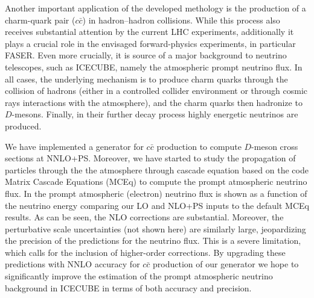\documentclass{FBR_Bericht_2025}
\begin{document}
\begin{refsection}
Another important application of the developed \minnlo{} methology is the production
of a charm-quark pair ($c\bar c$) 
in hadron--hadron collisions. While this process also receives
substantial attention by the current LHC experiments, additionally it plays a crucial role in 
the envisaged forward-physics experiments, in particular FASER. Even more crucially,
it is source of a major background to neutrino telescopes, such as ICECUBE, namely
the atmospheric prompt neutrino flux.
In all cases, the underlying mechanism is to produce charm quarks through the collision
of hadrons (either in a controlled collider environment or through cosmic rays interactions 
with the atmosphere), and the charm quarks then hadronize to $D$-mesons. Finally, in 
their further decay process highly energetic neutrinos are produced.

We have implemented a \minnlo{} generator for $c\bar c$ production to compute
$D$-meson cross sections at NNLO+PS. Moreover, we have started to study 
the propagation of particles through the the atmosphere through cascade equation
based on the code Matrix Cascade Equations (MCEq) \cite{Fedynitch:2015zbe} to compute the prompt
atmospheric neutrino flux. In  the prompt atmospheric (electron) neutrino
flux is shown as a function of the neutrino energy comparing our LO and NLO+PS
inputs to the default MCEq results. As can be seen, the NLO corrections are substantial.
Moreover, the perturbative scale uncertainties (not shown here) are similarly large, 
jeopardizing the precision of the predictions for the neutrino flux. 
This is a severe limitation, which calls for the inclusion of higher-order corrections.
By upgrading these predictions with NNLO accuracy for $c\bar c$ production of 
our \minnlo{} generator we hope to significantly improve the estimation of the 
prompt atmospheric neutrino background in ICECUBE in terms of both accuracy and
precision.


\end{refsection}
\end{document}
